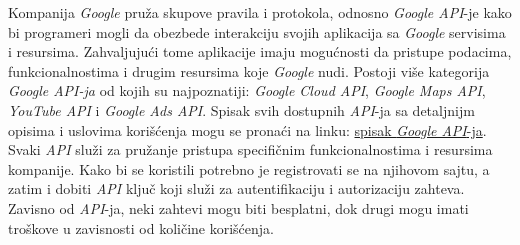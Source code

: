 \documentclass[android.tex]{subfiles}
\begin{document}
Kompanija \textit{Google} pruža skupove pravila i protokola, odnosno \textit{Google API}-je kako bi programeri mogli da obezbede interakciju svojih aplikacija sa \textit{Google} servisima i resursima. Zahvaljujući tome aplikacije imaju mogućnosti da pristupe podacima, funkcionalnostima i drugim resursima koje \textit{Google} nudi. Postoji više kategorija \textit{Google API-ja} od kojih su najpoznatiji: \textit{Google Cloud API}, \textit{Google Maps API}, \textit{YouTube API} i \textit{Google Ads API}. Spisak svih dostupnih \textit{API}-ja sa detaljnijm opisima i uslovima korišćenja mogu se pronaći na linku: \hyperlink{https://developers.google.com/apis-explorer}{spisak \textit{Google API}-ja}.  Svaki \textit{API} služi za pružanje pristupa specifičnim funkcionalnostima i resursima kompanije. Kako bi se koristili potrebno je registrovati se na njihovom sajtu, a zatim i dobiti \textit{API} ključ koji služi za autentifikaciju i autorizaciju zahteva. Zavisno od \textit{API}-ja, neki zahtevi mogu biti besplatni, dok drugi mogu imati troškove u zavisnosti od količine korišćenja.  
\end{document}
